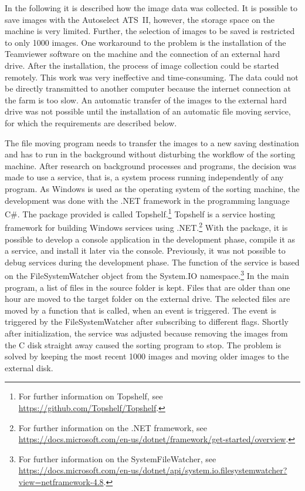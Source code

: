\bigskip
In the following it is described how the image data was collected. It is possible to save images with the Autoselect ATS~II, however, the storage space on the machine is very limited. Further, the selection of images to be saved is restricted to only 1000 images.
One workaround to the problem is the installation of the Teamviewer software on the machine and the connection of an external hard drive. After the installation, the process of image collection could be started remotely. This work was very ineffective and time-consuming. The data could not be directly transmitted to another computer because the internet connection at the farm is too slow. An automatic transfer of the images to the external hard drive was not possible until the installation of an automatic file moving service, for which the requirements are described below.

The file moving program needs to transfer the images to a new saving destination and has to run in the background without disturbing the workflow of the sorting machine. After research on background processes and programs, the decision was made to use a service, that is, a system process running independently of any program. As Windows is used as the operating system of the sorting machine, the development was done with the .NET framework in the programming language C\#. The package provided is called Topshelf.\footnote{For further information on Topshelf, see \url{https://github.com/Topshelf/Topshelf}.} Topshelf is a service hosting framework for building Windows services using .NET.\footnote{For further information on the .NET framework, see \url{https://docs.microsoft.com/en-us/dotnet/framework/get-started/overview}.} With the package, it is possible to develop a console application in the development phase, compile it as a service, and install it later via the console. Previously, it was not possible to debug services during the development phase. The function of the service is based on the FileSystemWatcher object from the System.IO namespace.\footnote{For further information on the SystemFileWatcher, see \url{https://docs.microsoft.com/en-us/dotnet/api/system.io.filesystemwatcher?view=netframework-4.8}.} In the main program, a list of files in the source folder is kept. Files that are older than one hour are moved to the target folder on the external drive. The selected files are moved by a function that is called, when an event is triggered. The event is triggered by the FileSystemWatcher after subscribing to different flags. Shortly after initialization, the service was adjusted because removing the images from the C disk straight away caused the sorting program to stop. The problem is solved by keeping the most recent 1000 images and moving older images to the external disk.

